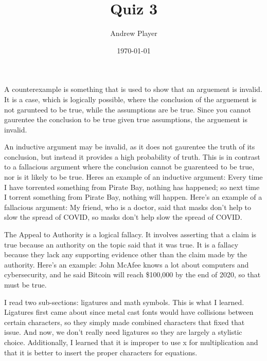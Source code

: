 \documentclass[12pt]{article}
\title{Quiz 3}
\author{Andrew Player}
\date{\today}
\makeatletter
\theoremstyle{homework}
\newenvironment{exercise}[1]
{\def\@currentlabel{#1}\exercisecore}
{\endexercisecore}
\makeatother
\begin{document}
\maketitle

\begin{exercise}{Question \# 1}
\end{exercise}
\noindent
A counterexample is something that is used to show that an arguement
is invalid. It is a case, which is logically possible, where the 
conclusion of the arguement is not garunteed to be true, while the 
assumptions are be true. Since you cannot gaurentee the conclusion 
to be true given true assumptions, the arguement is invalid.


\begin{exercise}{Question \# 2}
\end{exercise}
\noindent
An inductive argument may be invalid, as it does not gaurentee the 
truth of its conclusion, but instead it provides a high probability 
of truth. This is in contrast to a fallacious argument where the 
conclusion cannot be guarenteed to be true, nor is it likely to be 
true. Heres an example of an inductive argument: Every time I have
torrented something from Pirate Bay, nothing has happened; so next
time I torrent something from Pirate Bay, nothing will happen. 
Here's an example of a fallacious argument: My friend, who is a 
doctor, said that masks don't help to slow the spread of COVID, so 
masks don't help slow the spread of COVID.

\begin{exercise}{Question \# 3}
\end{exercise}
\noindent
The Appeal to Authority is a logical fallacy. It involves asserting 
that a claim is true because an authority on the topic said that it 
was true. It is a fallacy because they lack any supporting evidence 
other than the claim made by the authority. Here's an example:
John McAfee knows a lot about computers and cybersecurity, and 
he said Bitcoin will reach \$100,000 by the end of 2020, so that
must be true.
\newline
\newline
\newline
\newline
 
\begin{exercise}{Question \# 4}
\end{exercise}
\noindent
I read two sub-sections: ligatures and math symbols. This is what I
learned. Ligatures first came about since metal cast fonts would have
collisions between certain characters, so they simply made combined 
characters that fixed that issue. And now, we don't really need 
ligatures so they are largely a stylistic choice. Additionally, I 
learned that it is improper to use x for multiplication and that it 
is better to insert the proper characters for equations.
\end{document}
